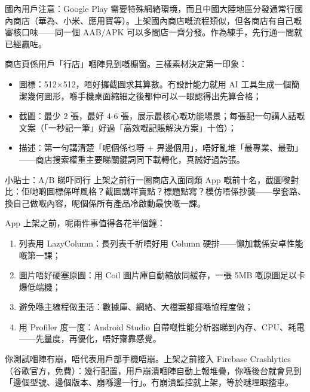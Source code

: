 國內用戶注意：Google Play 需要特殊網絡環境，而且中國大陸地區分發通常行國內商店（華為、小米、應用寶等）。上架國內商店嘅流程類似，但各商店有自己嘅審核口味——同一個 AAB/APK 可以多間店一齊分發。作為練手，先行通一間就已經贏咗。


商店頁係用戶「行店」嗰陣見到嘅櫥窗。三樣素材決定第一印象：

\begin{itemize}
  \item 圖標：512×512，唔好攞截圖求其算數。冇設計能力就用 AI 工具生成一個簡潔幾何圖形，喺手機桌面縮細之後都仲可以一眼認得出先算合格；
  \item 截圖：最少 2 張，最好 4-6 張，展示最核心嘅功能場景；每張配一句講人話嘅文案（「一秒記一筆」好過「高效嘅記賬解決方案」十倍）；
  \item 描述：第一句講清楚「呢個係乜嘢 + 畀邊個用」，唔好亂堆「最專業、最勁」——商店搜索權重主要睇關鍵詞同下載轉化，真誠好過誇張。
\end{itemize}

\begin{tcbinfo}{小貼士：A/B 睇吓同行}
上架之前行一圈商店入面同類 App 嘅前十名，截圖嚟對比：佢哋啲圖標係咩風格？截圖講咩賣點？標題點寫？模仿唔係抄襲——學套路、換自己做嘅內容，呢個係所有產品冷啟動最快嘅一課。

\end{tcbinfo}


App 上架之前，呢兩件事值得各花半個鐘：


\begin{enumerate}
  \item 列表用 LazyColumn：長列表千祈唔好用 Column 硬排——懶加載係安卓性能嘅第一課；
  \item 圖片唔好硬塞原圖：用 Coil 圖片庫自動縮放同緩存，一張 5MB 嘅原圖足以卡爆低端機；
  \item 避免喺主線程做重活：數據庫、網絡、大檔案都擺喺協程度做；
  \item 用 Profiler 度一度：Android Studio 自帶嘅性能分析器睇到內存、CPU、耗電——先量度，再優化，唔好齋靠感覺。
\end{enumerate}


你測試嗰陣冇崩，唔代表用戶部手機唔崩。上架之前接入 Firebase Crashlytics（谷歌官方，免費）：幾行配置，用戶崩潰嗰陣自動上報堆疊，你喺後台就會見到「邊個型號、邊個版本、崩喺邊一行」。冇崩潰監控就上架，等於瞇埋眼揸車。

